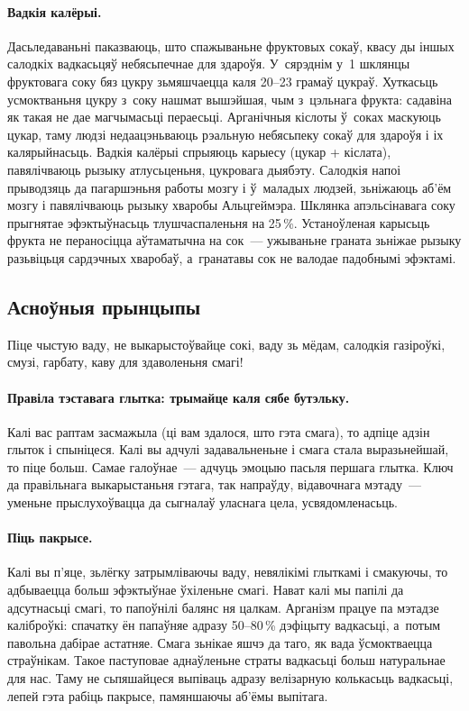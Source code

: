 \paragraph{Вадкія калёрыі.}
Дасьледаваньні паказваюць, што спажываньне фруктовых сокаў, квасу ды іншых салодкіх вадкасьцяў небясьпечнае для здароўя. У~сярэднім у~1 шклянцы фруктовага соку бяз цукру зьмяшчаецца каля 20--23 грамаў цукраў. Хуткасьць усмоктваньня цукру з~соку нашмат вышэйшая, чым з~цэльнага фрукта: садавіна як такая не дае магчымасьці пераесьці. Арганічныя кіслоты ў~соках маскуюць цукар, таму людзі недаацэньваюць рэальную небясьпеку сокаў для здароўя і іх калярыйнасьць. Вадкія калёрыі спрыяюць карыесу (цукар + кіслата), павялічваюць рызыку атлусьценьня, цукровага дыябэту. Салодкія напоі прыводзяць да пагаршэньня работы мозгу і ў~маладых людзей, зьніжаюць аб'ём мозгу і павялічваюць рызыку хваробы Альцгеймэра. Шклянка апэльсінавага соку прыгнятае эфэктыўнасьць тлушчаспаленьня на 25\,\%. Устаноўленая карысьць фрукта не пераносіцца аўтаматычна на сок~--- ужываньне граната зьніжае рызыку разьвіцьця сардэчных хваробаў, а~гранатавы сок не валодае падобнымі эфэктамі.

\subsection{Асноўныя прынцыпы}

Піце чыстую ваду, не выкарыстоўвайце сокі, ваду зь мёдам, салодкія газіроўкі, смузі, гарбату, каву для здаволеньня смагі!

\paragraph{Правіла тэставага глытка: трымайце каля сябе бутэльку.}
Калі вас раптам засмажыла (ці вам здалося, што гэта смага), то адпіце адзін глыток і спыніцеся. Калі вы адчулі задавальненьне і смага стала выразьнейшай, то піце больш. Самае галоўнае~--- адчуць эмоцыю пасьля першага глытка. Ключ да правільнага выкарыстаньня гэтага, так напраўду, відавочнага мэтаду~--- уменьне прыслухоўвацца да сыгналаў уласнага цела, усвядомленасьць.


\paragraph{Піць пакрысе.}
Калі вы п'яце, зьлёгку затрымліваючы ваду, невялікімі глыткамі і смакуючы, то адбываецца больш эфэктыўнае ўхіленьне смагі. Нават калі мы папілі да адсутнасьці смагі, то папоўнілі балянс ня цалкам. Арганізм працуе па мэтадзе каліброўкі: спачатку ён папаўняе адразу 50--80\,\% дэфіцыту вадкасьці, а~потым павольна дабірае астатняе. Смага зьнікае яшчэ да таго, як вада ўсмоктваецца страўнікам. Такое паступовае аднаўленьне страты вадкасьці больш натуральнае для нас. Таму не сьпяшайцеся выпіваць адразу велізарную колькасьць вадкасьці, лепей гэта рабіць пакрысе, памяншаючы аб'ёмы выпітага.


